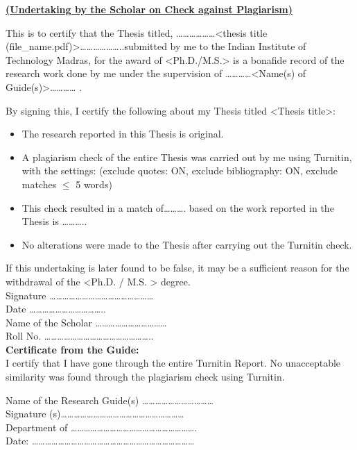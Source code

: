 \begin{center}
    \textbf{\underline{(Undertaking by the Scholar on Check against Plagiarism)}}\\
\end{center}

\begin{singlespacing}
    

    This is to certify that the Thesis titled, ………………<thesis title 
(file\_name.pdf)>………………..submitted by me to the Indian Institute of Technology 
Madras, for the award of <Ph.D./M.S.> is a bonafide record of the research work done by me 
under the supervision of …………<Name(s) of Guide(s)>………… . 

By signing this, I certify the following about my Thesis titled <Thesis title>:
\begin{itemize}
    \item The research reported in this Thesis is original.
    \item A plagiarism check of the entire Thesis was carried out by me using Turnitin, with the 
settings: (exclude quotes: ON, exclude bibliography: ON, exclude matches $\leq$ 5 words)
    \item This check resulted in a match of………. %
based on the work reported in the Thesis is ………..%
    \item No alterations were made to the Thesis after carrying out the Turnitin check.
\end{itemize}

If this undertaking is later found to be false, it may be a sufficient reason for the withdrawal of the <Ph.D. / M.S. > degree.\\
Signature ………………………………………… \\
Date ……………………………..\\
Name of the Scholar …………………………… \\
Roll No. …………………………………………..\\


\textbf{Certificate from the Guide:}\\
I certify that I have gone through the entire Turnitin Report. No unacceptable similarity was 
found through the plagiarism check using Turnitin.
 
Name of the Research Guide(s) …………………………… \\
Signature (s)………………………………………………… \\
Department of …………………………………………………. \\
Date: …………………………………………………………………\\

\end{singlespacing}
